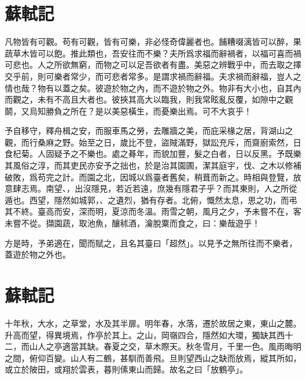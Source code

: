 \theendnotes

\section[超然臺記\quad{\small 蘇軾}]{{\normalsize 蘇軾}\quad {}記}
凡物皆有可觀。苟有可觀，皆有可樂，非必怪奇偉麗者也。餔糟啜{漓}皆可以醉，果蔬草木皆可以飽。推此類也，吾安往而不樂？夫所爲求福而辭禍者，以福可喜而禍可悲也。人之所欲無窮，而物之可以足吾欲者有盡。美惡之辨戰{乎}中，而去取之擇交乎前，則可樂者常少，而可悲者常多。是謂求禍而辭福。夫求禍而辭福，豈人之情也哉？物有以蓋之矣。彼遊於物之內，而不遊於物之外。物非有大小也，自其內而觀之，未有不高且大者也。彼挾其高大以臨我，則我常眩亂反覆，如隙中之觀鬬，又烏知勝負之所在？是以美惡橫生，而憂樂出焉。可不大哀乎！%

予自移守，釋舟楫之安，而服車馬之勞，去雕牆之美，而庇采椽之居，背湖山之觀，而行桑麻之野。始至之日，歲比不登，盜賊滿野，獄訟充斥，而齋廚索然，日食杞菊。人固疑予之不樂也。處之朞年，而貌加豐，髮之白者，日以反黑。予既樂其風俗之淳，而其吏民亦安予之拙也，於是治其園圃，潔其庭宇，伐、之木以修補破敗，爲苟完之計。而園之北，因城以爲臺者舊矣，稍葺而新之。時相與登覽，放意肆志焉。南望、，出沒隱見，若近若遠，庶幾有隱君子乎？而其東則，人之所從遁也。西望，隱然如城郭，、之遺烈，猶有存者。北俯，慨然{太}息，思之功，而弔其不終。臺高而安，深而明，夏涼而冬溫。雨雪之朝，風月之夕，予未嘗不在，客未嘗不從。擷園蔬，取池魚，釀秫酒，瀹脫粟而食之，曰：樂哉遊乎！%

方是時，予弟適在，聞而賦之，且名其臺曰「超然」。以見予之無所往而不樂者，蓋遊於物之外也。%

\theendnotes

\section[放鶴亭記\quad{\small 蘇軾}]{{\normalsize 蘇軾}\quad {}記}
十年秋，大水，之草堂，水及其半扉。明年春，水落，遷於故居之東，東山之麓。升高而望，得異境焉，作亭於其上。之山，岡嶺四合，隱然如大環，獨缺其西{十二}，而山人之亭適當其缺。春夏之交，草木際天。秋冬雪月，千里一色。風雨晦明之間，俯仰百變。山人有二鶴，甚馴而善飛。旦則望西山之缺而放焉，縱其所如，或立於陂田，或翔於雲表，暮則傃東山而歸。故名之曰「放鶴亭」。%

